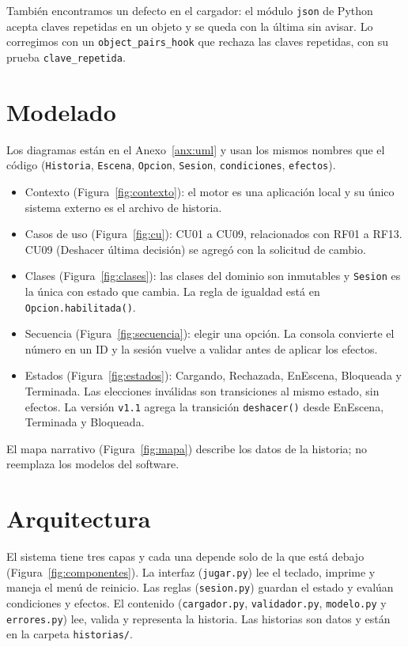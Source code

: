 \documentclass[11pt,letterpaper]{article}
\newcommand{\cod}[1]{\texttt{#1}}
\begin{document}
También encontramos un defecto en el cargador: el módulo \cod{json} de Python acepta claves repetidas en un objeto y se queda con la última sin avisar. Lo corregimos con un \cod{object\_pairs\_hook} que rechaza las claves repetidas, con su prueba \cod{clave\_repetida}.

\section{Modelado}
Los diagramas están en el Anexo~\ref{anx:uml} y usan los mismos nombres que el código (\cod{Historia}, \cod{Escena}, \cod{Opcion}, \cod{Sesion}, \cod{condiciones}, \cod{efectos}).
\begin{itemize}
  \item Contexto (Figura~\ref{fig:contexto}): el motor es una aplicación local y su único sistema externo es el archivo de historia.
  \item Casos de uso (Figura~\ref{fig:cu}): CU01 a CU09, relacionados con RF01 a RF13. CU09 (Deshacer última decisión) se agregó con la solicitud de cambio.
  \item Clases (Figura~\ref{fig:clases}): las clases del dominio son inmutables y \cod{Sesion} es la única con estado que cambia. La regla de igualdad está en \cod{Opcion.habilitada()}.
  \item Secuencia (Figura~\ref{fig:secuencia}): elegir una opción. La consola convierte el número en un ID y la sesión vuelve a validar antes de aplicar los efectos.
  \item Estados (Figura~\ref{fig:estados}): Cargando, Rechazada, EnEscena, Bloqueada y Terminada. Las elecciones inválidas son transiciones al mismo estado, sin efectos. La versión \cod{v1.1} agrega la transición \cod{deshacer()} desde EnEscena, Terminada y Bloqueada.
\end{itemize}
El mapa narrativo (Figura~\ref{fig:mapa}) describe los datos de la historia; no reemplaza los modelos del software.

\section{Arquitectura}
El sistema tiene tres capas y cada una depende solo de la que está debajo (Figura~\ref{fig:componentes}). La interfaz (\cod{jugar.py}) lee el teclado, imprime y maneja el menú de reinicio. Las reglas (\cod{sesion.py}) guardan el estado y evalúan condiciones y efectos. El contenido (\cod{cargador.py}, \cod{validador.py}, \cod{modelo.py} y \cod{errores.py}) lee, valida y representa la historia. Las historias son datos y están en la carpeta \cod{historias/}.
\end{document}
